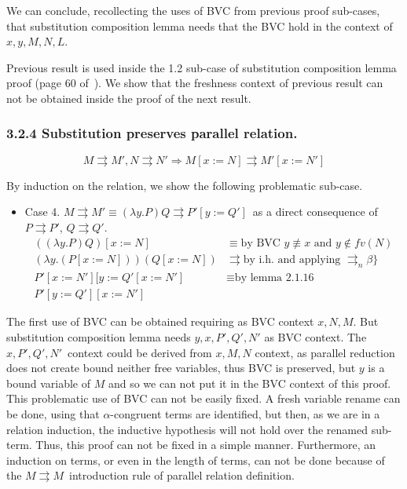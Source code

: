 \documentclass{article}
\newcommand{\alp}{\ensuremath{\alpha}}
\newcommand{\p}{\ensuremath{\rightrightarrows}}
\newcommand{\pn}{\ensuremath{\rightrightarrows_n}}
\newcommand{\lam}{\ensuremath{\lambda}}
\begin{document}
We can conclude, recollecting the uses of BVC from previous proof sub-cases, that substitution composition lemma needs that the BVC hold in the context of $x,y,M,N,L$.

Previous result is used inside the 1.2 sub-case of substitution composition lemma proof (page 60 of~\cite{barendregt81}). We show that the freshness context of previous result can not be obtained inside the proof of the next result.

\subsubsection*{3.2.4 Substitution preserves parallel relation.}

      \[ M \p M' , N \p N' \Rightarrow M [x:=N] \p M'[x:=N'] \]

By induction on the relation, we show the following problematic sub-case.

\begin{itemize}
\item{Case 4.} $M \p M' \equiv (\lam y. P)Q \p P'[y:=Q']$\ as a direct consequence of $P \p P'$, $Q \p Q'$.
  \[\begin{array}{ll}
      ((\lam y. P)Q) [x:=N] & \equiv \text{by BVC } y \not\equiv x \text{ and } y \not\in fv(N) \\
      (\lam y. (P [x:=N]))(Q [x:=N])  & \p \text{by i.h. and applying } \pn \beta\} \\
      P'[x:=N'][y := Q'[x:=N']  & \equiv \text{by lemma 2.1.16} \\
      P'[y:=Q'][x:=N']
  \end{array}\]
\end{itemize}

The first use of BVC can be obtained requiring as BVC context $x,N,M$. But substitution composition lemma needs $y,x,P',Q',N'$ as BVC context. The $x,P',Q',N'$\ context could be derived from $x,M,N$ context, as parallel reduction does not create bound neither free variables, thus BVC is preserved, but $y$ is a bound variable of $M$ and so we can not put it in the BVC context of this proof. This problematic use of BVC can not be easily fixed. A fresh variable rename can be done, using that \alp-congruent terms are identified, but then, as we are in a relation induction, the inductive hypothesis will not hold over the renamed sub-term. Thus, this proof can not be fixed in a simple manner. Furthermore, an induction on terms, or even in the length of terms, can not be done because of the $M \p M$\ introduction rule of parallel relation definition. 
\end{document}
